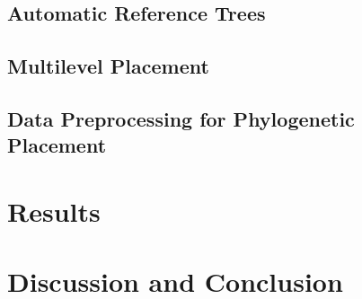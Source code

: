 \documentclass{bioinfo}
\begin{document}
\subsection{Automatic Reference Trees}
\label{sec:Methods:sub:AutomaticTrees}


\subsection{Multilevel Placement}
\label{sec:Methods::sub:MultilevelPlacement}



\subsection{Data Preprocessing for Phylogenetic Placement}
\label{sec:Methods:sub:DataPreprocessing}


\section{Results}
\label{sec:Results}



\section{Discussion and Conclusion}
\label{sec:DiscussionConclusion}
\end{document}
